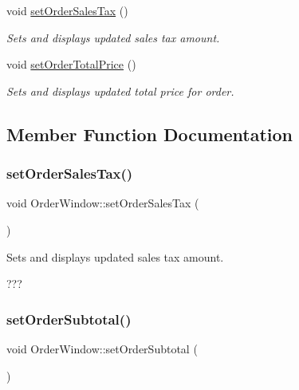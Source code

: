 \begin{DoxyCompactItemize}
void \mbox{\hyperlink{class_order_window_a6dfbb77a1a8911cc789062c6c00b7fe5}{set\+Order\+Sales\+Tax}} ()
\begin{DoxyCompactList}\small\item\em Sets and displays updated sales tax amount. \end{DoxyCompactList}\item 
void \mbox{\hyperlink{class_order_window_af1b6d198cf89a68c63afa28bc986786a}{set\+Order\+Total\+Price}} ()
\begin{DoxyCompactList}\small\item\em Sets and displays updated total price for order. \end{DoxyCompactList}\end{DoxyCompactItemize}


\subsection{Member Function Documentation}
\mbox{\label{class_order_window_a6dfbb77a1a8911cc789062c6c00b7fe5}} 
\subsubsection{\texorpdfstring{setOrderSalesTax()}{setOrderSalesTax()}}
{\footnotesize\ttfamily void Order\+Window\+::set\+Order\+Sales\+Tax (\begin{DoxyParamCaption}{ }\end{DoxyParamCaption})}



Sets and displays updated sales tax amount. 

??? \mbox{\label{class_order_window_a9b1e24f50bfc70c3920932f58331f917}} 
\subsubsection{\texorpdfstring{setOrderSubtotal()}{setOrderSubtotal()}}
{\footnotesize\ttfamily void Order\+Window\+::set\+Order\+Subtotal (\begin{DoxyParamCaption}{ }\end{DoxyParamCaption})}



